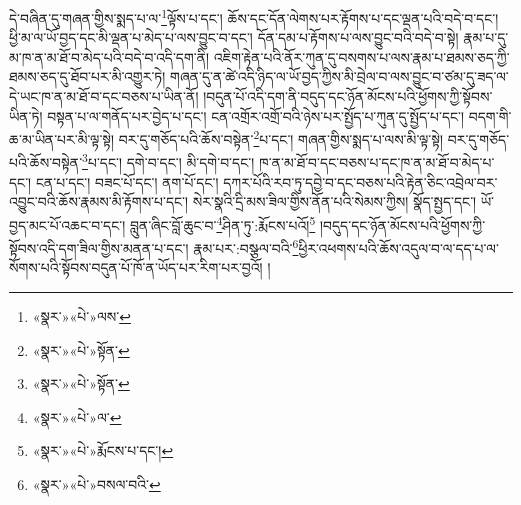 དེ་བཞིན་དུ་གཞན་གྱིས་སྨད་པ་ལ་\footnote{«སྣར་»«པེ་»ལས་}ལྟོས་པ་དང་། ཆོས་དང་དོན་ལེགས་པར་རྟོགས་པ་དང་ལྡན་པའི་བདེ་བ་དང་། ཕྱི་མ་ལ་ཡོ་བྱད་དང་མི་ལྡན་པ་མེད་པ་ལས་བྱུང་བ་དང་། དོན་དམ་པ་རྟོགས་པ་ལས་བྱུང་བའི་བདེ་བ་སྟེ། རྣམ་པ་དུ་མ་ཁ་ན་མ་ཐོ་བ་མེད་པའི་བདེ་བ་འདི་དག་ནི། འཇིག་རྟེན་པའི་ནོར་ཀུན་དུ་བསགས་པ་ལས་རྣམ་པ་ཐམས་ཅད་ཀྱི་ཐམས་ཅད་དུ་ཐོབ་པར་མི་འགྱུར་ཏེ། གཞན་དུ་ན་ཚེ་འདི་ཉིད་ལ་ཡོ་བྱད་ཀྱིས་མི་བྲེལ་བ་ལས་བྱུང་བ་ཙམ་དུ་ཟད་ལ་དེ་ཡང་ཁ་ན་མ་ཐོ་བ་དང་བཅས་པ་ཡིན་ནོ། །བདུན་པོ་འདི་དག་ནི་བདུད་དང་ཉོན་མོངས་པའི་ཕྱོགས་ཀྱི་སྟོབས་ཡིན་ཏེ། བསྟན་པ་ལ་གནོད་པར་བྱེད་པ་དང་། ངན་འགྲོར་འགྲོ་བའི་ཉེས་པར་སྤྱོད་པ་ཀུན་དུ་སྤྱོད་པ་དང་། བདག་གི་ཆ་མ་ཡིན་པར་མི་ལྟ་སྟེ། བར་དུ་གཅོད་པའི་ཆོས་བསྟེན་\footnote{«སྣར་»«པེ་»སྟོན་}པ་དང་། གཞན་གྱིས་སྨད་པ་ལས་མི་ལྟ་སྟེ། བར་དུ་གཅོད་པའི་ཆོས་བསྟེན་\footnote{«སྣར་»«པེ་»སྟོན་}པ་དང་། དགེ་བ་དང་། མི་དགེ་བ་དང་། ཁ་ན་མ་ཐོ་བ་དང་བཅས་པ་དང་ཁ་ན་མ་ཐོ་བ་མེད་པ་དང་། ངན་པ་དང་། བཟང་པོ་དང་། ནག་པོ་དང་། དཀར་པོའི་རབ་ཏུ་དབྱེ་བ་དང་བཅས་པའི་རྟེན་ཅིང་འབྲེལ་བར་འབྱུང་བའི་ཆོས་རྣམས་མི་རྟོགས་པ་དང་། སེར་སྣའི་དྲི་མས་ཟིལ་གྱིས་ནོན་པའི་སེམས་ཀྱིས། སྣོད་སྤྱད་དང་། ཡོ་བྱད་མང་པོ་འཆང་བ་དང་། བླུན་ཞིང་བློ་ཆུང་བ་\footnote{«སྣར་»«པེ་»ལ་}ཤིན་ཏུ་:རྨོངས་པའོ།\footnote{«སྣར་»«པེ་»རྨོངས་པ་དང་།} །བདུད་དང་ཉོན་མོངས་པའི་ཕྱོགས་ཀྱི་སྟོབས་འདི་དག་ཟིལ་གྱིས་མནན་པ་དང་། རྣམ་པར་:བསྩལ་བའི་\footnote{«སྣར་»«པེ་»བསལ་བའི་}ཕྱིར་འཕགས་པའི་ཆོས་འདུལ་བ་ལ་དད་པ་ལ་སོགས་པའི་སྟོབས་བདུན་པོ་ཁོ་ན་ཡོད་པར་རིག་པར་བྱའོ། །

